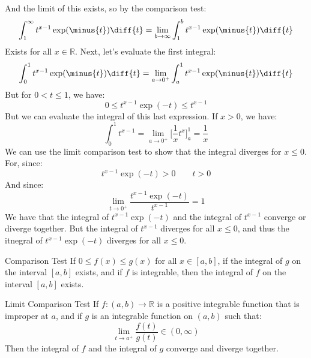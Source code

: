         And the limit of this exists, so by the comparison test:
        \begin{equation}
            \int_{1}^{\infty}t^{x-1}\exp(\minus{t})\diff{t}=
            \underset{b\rightarrow\infty}{\lim}
            \int_{1}^{b}t^{x-1}\exp(\minus{t})\diff{t}
        \end{equation}
        Exists for all $x\in\mathbb{R}$. Next, let's evaluate the
        first integral:
        \begin{equation}
            \int_{0}^{1}t^{x-1}\exp(\minus{t})\diff{t}=
            \underset{a\rightarrow{0}^{+}}{\lim}
            \int_{a}^{1}t^{x-1}\exp(\minus{t})\diff{t}
        \end{equation}
        But for $0<t\leq{1}$, we have:
        \begin{equation}
            0\leq{t}^{x-1}\exp(\minus{t})\leq{t}^{x-1}
        \end{equation}
        But we can evaluate the integral of this last expression.
        If $x>0$, we have:
        \begin{equation}
            \int_{0}^{1}t^{x-1}=
            \underset{a\rightarrow{0}^{+}}{\lim}
            \Big[\frac{1}{x}t^{x}\Big]_{a}^{1}=\frac{1}{x}
        \end{equation}
        We can use the limit comparison test to show that the
        integral diverges for $x\leq{0}$. For, since:
        \begin{equation}
            t^{x-1}\exp(\minus{t})>0
            \quad\quad
            t>0
        \end{equation}
        And since:
        \begin{equation}
            \underset{t\rightarrow{0}^{+}}{\lim}
            \frac{t^{x-1}\exp(\minus{t})}{t^{x-1}}=1
        \end{equation}
        We have that the integral of $t^{x-1}\exp(\minus{t})$
        and the integral of $t^{x-1}$ converge or diverge together.
        But the integral of $t^{x-1}$ diverges for all $x\leq{0}$,
        and thus the itnegral of $t^{x-1}\exp(\minus{t})$ diverges
        for all $x\leq{0}$.
        \begin{ltheorem}{Comparison Test}
            If $0\leq{f}(x)\leq{g}(x)$ for all $x\in[a,b]$,
            if the integral of $g$ on the interval $[a,b]$ exists,
            and if $f$ is integrable, then the integral of
            $f$ on the interval $[a,b]$ exists.
        \end{ltheorem}
        \begin{ltheorem}{Limit Comparison Test}
            If $f:(a,b)\rightarrow\mathbb{R}$ is a positive
            integrable function that is improper at $a$, and if
            $g$ is an integrable function on $(a,b)$ such that:
            \begin{equation}
                \underset{t\rightarrow{a}^{+}}{\lim}
                \frac{f(t)}{g(t)}\in(0,\infty)
            \end{equation}
            Then the integral of $f$ and the integral of $g$
            converge and diverge together.
        \end{ltheorem}
